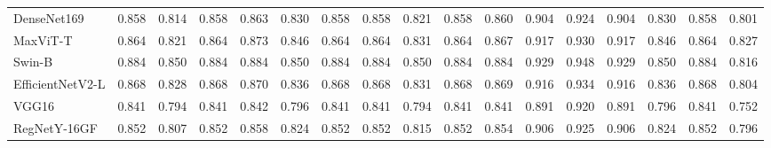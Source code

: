 \begin{table}[t]
\begin{tabular}{lcccccccccccccccc}
DenseNet169 & 0.858 & 0.814 & 0.858 & 0.863 & 0.830 & 0.858 & 0.858 & 0.821 & 0.858 & 0.860 & 0.904 & 0.924 & 0.904 & 0.830 & 0.858 & 0.801 \\
MaxViT-T & 0.864 & 0.821 & 0.864 & 0.873 & 0.846 & 0.864 & 0.864 & 0.831 & 0.864 & 0.867 & 0.917 & 0.930 & 0.917 & 0.846 & 0.864 & 0.827 \\
Swin-B & 0.884 & 0.850 & 0.884 & 0.884 & 0.850 & 0.884 & 0.884 & 0.850 & 0.884 & 0.884 & 0.929 & 0.948 & 0.929 & 0.850 & 0.884 & 0.816 \\
EfficientNetV2-L & 0.868 & 0.828 & 0.868 & 0.870 & 0.836 & 0.868 & 0.868 & 0.831 & 0.868 & 0.869 & 0.916 & 0.934 & 0.916 & 0.836 & 0.868 & 0.804 \\
VGG16 & 0.841 & 0.794 & 0.841 & 0.842 & 0.796 & 0.841 & 0.841 & 0.794 & 0.841 & 0.841 & 0.891 & 0.920 & 0.891 & 0.796 & 0.841 & 0.752 \\
RegNetY-16GF & 0.852 & 0.807 & 0.852 & 0.858 & 0.824 & 0.852 & 0.852 & 0.815 & 0.852 & 0.854 & 0.906 & 0.925 & 0.906 & 0.824 & 0.852 & 0.796 \\
\hline
\end{tabular}
\end{table}
